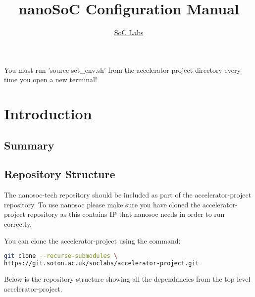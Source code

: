 \documentclass{report}
\title{nanoSoC Configuration Manual}
\author{\href{http://www.soclabs.org}{SoC Labs}}
\makeatletter
\newenvironment{infobox}[1][]{%
   \begin{info@box}%
      \begin{tcolorbox}[colback=red!15!white,%
            colframe=red!75!black,%
            title=Additional information\ifstrempty{#1}{}{: #1}.%
         ]%
}{%
      \end{tcolorbox}%
   \end{info@box}%
}
\makeatother
\begin{document}
\maketitle

\begin{infobox}
    You must run 'source set\_env.sh' from the accelerator-project directory every time you open a new terminal!
\end{infobox} \par
 
\tableofcontents
\clearpage
\chapter{Introduction}


\section{Summary}

\section{Repository Structure}
The nanosoc-tech repository should be included as part of the accelerator-project repository. To use nanosoc please make sure you have cloned the accelerator-project
repository as this contains IP that nanosoc needs in order to run correctly.

You can clone the accelerator-project using the command:

\begin{lstlisting}[language=bash]
git clone --recurse-submodules \
https://git.soton.ac.uk/soclabs/accelerator-project.git 
\end{lstlisting}

Below is the repository structure showing all the dependancies from the top level accelerator-project.
\end{document}

